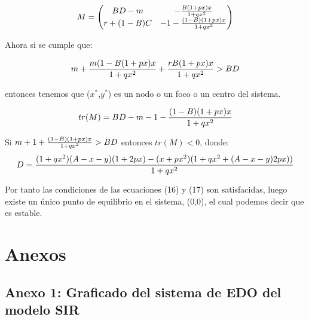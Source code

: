 \documentclass{article}
\begin{document}
\begin{equation}
	M=\left(
	\begin{matrix}
		 BD-m & -{B(1+px)x\over 1+qx^2}\\
		 r+(1-B)C & -1-{(1-B)(1+px)x\over 1+qx^2}
	\end{matrix}
	\right)
\end{equation}

Ahora si se cumple que:

\begin{equation}
m+{m(1-B(1+px)x\over 1+qx^2}+{rB(1+px)x\over 1+qx^2}>BD
\end{equation}

entonces tenemos que ($x^*$,$y^*$) es un nodo o un foco o un centro del sistema.

\begin{equation}
	tr(M)=BD-m-1-{(1-B)(1+px)x\over 1+qx^2}
\end{equation}

Si $m+1+{(1-B)(1+px)x\over 1+qx^2}>BD$ entonces $tr(M)<0$, donde:
$$D={(1+qx^2)(A-x-y)(1+2px)-(x+px^2)(1+qx^2+(A-x-y)2px))\over 1+qx^2}$$

Por tanto las condiciones de las ecuaciones (16) y (17) son satisfacidas, luego existe un \'unico punto de equilibrio en el sistema, (0,0), el cual podemos decir que es estable. 




	


\section{Anexos}

\subsection*{Anexo 1: Graficado del sistema de EDO del modelo SIR}
\end{document}
